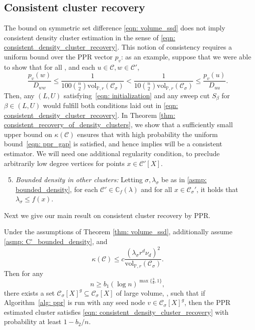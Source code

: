 \documentclass[11pt,twoside]{article}
\newcommand{\vol}{\mathrm{vol}}
\newcommand{\1}{\mathbbm{1}}
\newcommand{\pbf}{p}        %
\newcommand{\Xbf}{X}
\newcommand{\Pbb}{\mathbb{P}}
\newcommand{\Cbb}{\mathbb{C}}
\newcommand{\Cset}{\mathcal{C}}
\newcommand{\Csig}{\Cset_{\sigma}}
\newcommand{\Cest}{\widehat{C}}
\begin{document}
\subsection{Consistent cluster recovery}

The bound on symmetric set difference \eqref{eqn: volume_ssd} does not imply 
consistent density cluster estimation in the sense of \eqref{eqn:
  consistent_density_cluster_recovery}. This notion of consistency requires a
uniform bound over the PPR vector $\pbf_v$: as an example, suppose that we were
able to show that for all \smash{$\Cset' \in \Cbb_f(\lambda), \Cset' \neq
  \Cset$}, and each $u \in \Cset, w \in \Cset'$,  
\begin{equation}
\label{eqn: ppr_gap}
\frac{\pbf_v(w)}{D_{ww}} \leq \frac{1}{100 {n \choose 2} \vol_{\Pbb,r}(\Csig)} <
\frac{1}{10 {n \choose 2} \vol_{\Pbb,r}(\Csig)} \leq \frac{\pbf_v(u)}{D_{uu}}. 
\end{equation}
Then, any $(L,U)$ satisfying~\eqref{eqn: initialization} and any sweep cut
$S_{\beta}$ for $\beta \in (L,U)$ would fulfill both conditions laid out in
\eqref{eqn: consistent_density_cluster_recovery}. In Theorem 
\ref{thm: consistent_recovery_of_density_clusters}, we show that a sufficiently 
small upper bound on $\kappa(\Cset)$ ensures that with high probability the
uniform bound~\eqref{eqn: ppr_gap} is satisfied, and hence implies
\smash{$\Cest$} will be a consistent  estimator. We will need one additional 
regularity condition, to preclude arbitrarily low degree vertices for points $x
\in \Cset'[\Xbf]$.  

\begin{enumerate}[label=(A\arabic*)]
  \setcounter{enumi}{4}
\item 
  \label{asmp: C'_bounded_density}
  \emph{Bounded density in other clusters:} Letting $\sigma,\lambda_{\sigma}$ be   
  as in \ref{asmp: bounded_density}, for each $\Cset' \in \Cbb_f(\lambda)$ and
  for all $x \in \Csig'$, it holds that $\lambda_{\sigma} \leq f(x)$. 
\end{enumerate}

Next we give our main result on consistent cluster recovery by PPR.

\begin{theorem}
  \label{thm: consistent_recovery_of_density_clusters}
  Under the assumptions of Theorem \ref{thm: volume_ssd}, additionally assume 
  \ref{asmp: C'_bounded_density}, and 
  \begin{equation}
    \label{eqn: kappa_ub}
    \kappa(\Cset) \leq c \frac{(\lambda_{\sigma} r^d
      \nu_d)^2}{\vol_{\Pbb,r}(\Csig)}.
  \end{equation}
  Then for any
  $$
  n \geq b_1 (\log n)^{\max\{\frac{3}{d},1\}},
  $$
  there exists a set $\Csig[\Xbf]^g \subseteq \Csig[\Xbf]$ of large volume, 
  \smash{$\vol_{n,r}(\Csig[\Xbf]^g) \geq
    \vol_{n,r}(\Csig[\Xbf])/2$}, such that if Algorithm~\ref{alg:
    ppr} is run with any seed node $v \in \Csig[\Xbf]^g$, then the PPR estimated cluster \smash{$\Cest$} satisfies \eqref{eqn: consistent_density_cluster_recovery} with probability at least $1-b_2/n$.
\end{theorem}
\end{document}
